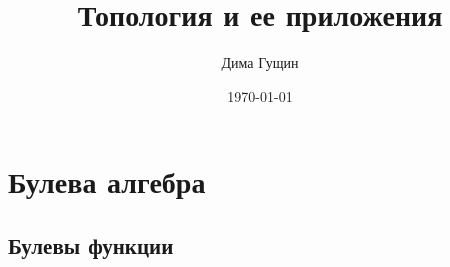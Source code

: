 \documentclass[12pt, oneside]{book}
\author{Дима Гущин}
\title{Топология и ее приложения}
\date{\today}
\begin{document}
	
	
		
	
		
	
	\chapter{Булева алгебра} 
		\section{Булевы функции}
		
		
		
		
		
		
	\titlespacing*{\chapter}{0pt}{0pt}{40pt}
	
\end{document}
